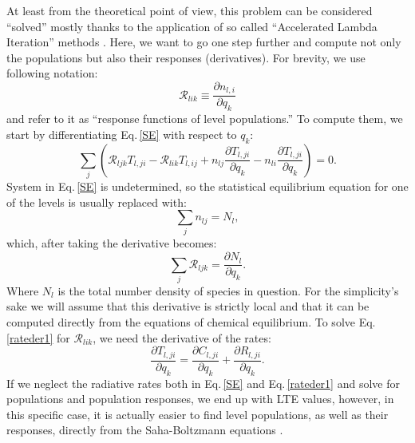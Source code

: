 \documentclass{aa}
\begin{document}
At least from the theoretical point of view, this problem can be considered ``solved'' mostly thanks to the application of so called ``Accelerated Lambda Iteration'' methods \citep[for an insightful review see][]{Hubeny03}.  Here, we want to go one step further and compute not only the populations but also their responses (derivatives). For brevity, we use following notation:
\begin{equation}
 {\mathcal R}_{lik} \equiv \frac{\partial n_{l,i}}{\partial q_k}
\end{equation}
and refer to it as ``response functions of level populations.'' To compute them, we start by differentiating Eq.\,\ref{SE} with respect to $q_k$:
\begin{equation}
 \sum_j \left ({\mathcal R}_{ljk} T_{l,ji} - {\mathcal R}_{lik} T_{l,ij} + n_{lj} \frac{\partial T_{l,ji}}{\partial q_k} - n_{li} \frac{\partial T_{l,ji}}{\partial q_k} \right ) = 0.
 \label{rateder1}
\end{equation}
System in Eq.\,\ref{SE} is undetermined, so the statistical equilibrium equation for one of the levels is usually replaced with:
\begin{equation}
 \sum_j n_{lj} = N_l,
\end{equation}
which, after taking the derivative becomes:
\begin{equation}
 \sum_j {\mathcal R}_{ljk} = \frac{\partial N_l}{\partial q_k}.
\end{equation}
Where $N_l$ is the total number density of species in question. For the simplicity's sake we will assume that this derivative is strictly local and that it can be computed directly from the equations of chemical equilibrium. To solve Eq.\,\ref{rateder1} for $\mathcal{R}_{lik}$, we need the derivative of the rates:
\begin{equation}
\frac{\partial T_{l,ji}}{\partial q_k} = \frac{\partial C_{l,ji}}{\partial q_k} + \frac{\partial R_{l,ji}}{\partial q_k}.
\label{rateder2}
\end{equation}
If we neglect the radiative rates both in Eq.\,\ref{SE} and Eq.\,\ref{rateder1} and solve for populations and population responses, we end up with LTE values, however, in this specific case, it is actually easier to find level populations, as well as their responses, directly from the Saha-Boltzmann equations \citep[see, e.g.][]{SIR}. 
\end{document}
